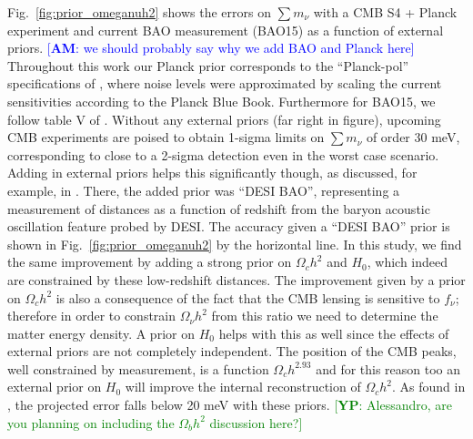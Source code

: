 \documentclass[aps,prd,reprint,superscriptaddress]{revtex4-1}
\newcommand{\am}[1]{\textcolor{blue}{[{\bf AM}: #1]}}
\newcommand{\yp}[1]{\textcolor{green}{[{\bf YP}: #1]}}
\newcommand{\reffig}[1]{Fig.~\ref{fig:#1}}
\begin{document}
\reffig{prior_omeganuh2} shows the errors on $\sum m_\nu$ with a CMB S4 + Planck experiment and current BAO measurement (BAO15) as a function of external priors. \am{we should probably say why we add BAO and Planck here}
Throughout this work our Planck prior corresponds to the ``Planck-pol'' specifications of \cite{allison:2015}, where noise levels were approximated by scaling the current sensitivities according to the Planck Blue Book.
Furthermore for BAO15, we follow table V of \cite{allison:2015}.
Without any external priors (far right in figure), upcoming CMB experiments are poised to obtain 1-sigma limits on $\sum m_\nu$ of order 30 meV, corresponding to close to a 2-sigma detection even in the worst case scenario. Adding in external priors helps this significantly though, as discussed, for example, in \cite{2013arXiv1309.5383A,pan:2015,allison:2015}. 
There, the added prior was ``DESI BAO'', representing a measurement of distances as a function of redshift from the baryon acoustic oscillation feature probed by DESI. The accuracy given a ``DESI BAO'' prior is shown in \reffig{prior_omeganuh2} by the horizontal line.
In this study, we find the same improvement by adding a strong prior on $\Omega_ch^2$ and $H_{0}$, which indeed are constrained by these low-redshift distances.
The improvement given by a prior on $\Omega_ch^2$ is also a consequence of the fact that the CMB lensing is sensitive to $f_\nu$; therefore in order to constrain $\Omega_{\nu}h^2$ from this ratio we need to determine the matter energy density. 
A prior on  $H_{0}$ helps with this as well since the effects of external priors are not completely independent.
The position of the CMB peaks, well constrained by measurement, is a function $\Omega_ch^{2.93}$ \cite{planck-collaboration:2014} and for this reason too an external prior on $H_{0}$ will improve the internal reconstruction of $\Omega_ch^2$.
As found in \cite{2013arXiv1309.5383A,pan:2015,allison:2015}, the projected error falls below 20 meV with these priors. \yp{Alessandro, are you planning on including the $\Omega_b h^2$ discussion here?}
\end{document}
